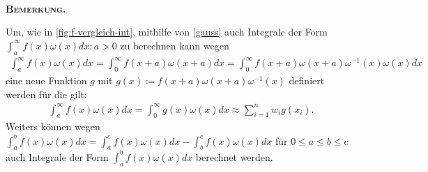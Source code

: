 \documentclass[12pt,a4paper]{scrartcl}
\numberwithin{equation}{section}
\numberwithin{myalgctr}{section}
\numberwithin{mytheoremctr}{section}
\numberwithin{mykorollarctr}{section}
\numberwithin{mylemmactr}{section}
\numberwithin{mybeispielctr}{section}
\newenvironment{bemerkung}{%
	\bigskip\noindent%
	\textsc{\textbf{\\Bemerkung.}}%
	\indent
}{\par\bigskip}  %
\begin{document}
\begin{bemerkung}
	Um, wie in \cref{fig:f-vergleich-int}, mithilfe von \cref{gauss} auch Integrale der Form $\int_{a}^{\infty}f(x)\omega(x)dx:a>0$ zu berechnen kann wegen \autocite[vgl.][278]{ana2}
	\begin{align*}
		\int_{a}^{\infty}f(x)\omega(x)dx = \int_{0}^{\infty}f(x+a)\omega(x+a)dx = \int_{0}^{\infty}f(x+a)\omega(x+a)\omega^{-1}(x)\omega(x)dx
	\end{align*}
	eine neue Funktion $g$ mit $g(x) \coloneqq f(x+a)\omega(x+a)\omega^{-1}(x)$ definiert werden f\"ur die gilt:
	\begin{align*}
		\int_{a}^{\infty}f(x)\omega(x)dx = \int_{0}^{\infty}g(x)\omega(x)dx \approx  \sum_{i=1}^{n}w_ig(x_i).
	\end{align*}
	Weiters k\"onnen wegen $\int_{a}^{b}f(x)\omega(x)dx = \int_{a}^{c}f(x)\omega(x)dx - \int_{b}^{c}f(x)\omega(x)dx$ f\"ur $0\leq a\leq b\leq c$ auch Integrale der Form $\int_{a}^{b}f(x)\omega(x)dx$ berechnet werden.
\end{bemerkung}
	
	
	
\end{document}
